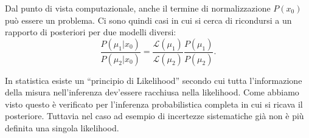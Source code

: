 Dal punto di vista computazionale, anche il termine di normalizzazione $P(x_0)$ può essere un problema.
Ci sono quindi casi in cui si cerca di ricondursi a un rapporto di posteriori per due modelli diversi:
\begin{equation*}
	\frac{P(\mu_1|x_0)}{P(\mu_2|x_0)} = \frac{\mathcal L(\mu_1)}{\mathcal L(\mu_2)} \frac{P(\mu_1)}{P(\mu_2)}.
\end{equation*}

In statistica esiste un ``principio di Likelihood'' secondo cui tutta l'informazione della misura nell'inferenza dev'essere racchiusa nella likelihood.
Come abbiamo visto questo è verificato per l'inferenza probabilistica completa in cui si ricava il posteriore.
Tuttavia nel caso ad esempio di incertezze sistematiche già non è più definita una singola likelihood.
